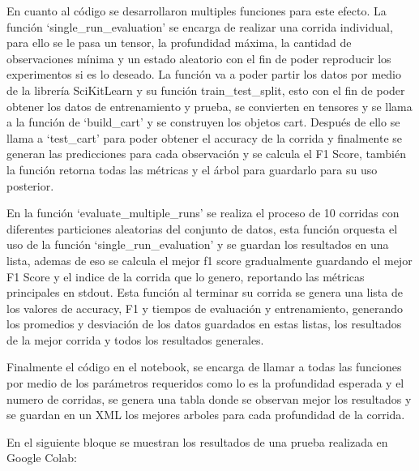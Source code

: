 \documentclass[12pt,a4paper]{article}
\begin{document}
En cuanto al código se desarrollaron multiples funciones para este efecto.
La función `single_run_evaluation' se encarga de realizar una corrida individual,
para ello se le pasa un tensor, la profundidad máxima, la cantidad de observaciones mínima y un estado aleatorio con el fin de
poder reproducir los experimentos si es lo deseado.
La función va a poder partir los datos por medio de la librería SciKitLearn y su función
train_test_split, esto con el fin de poder obtener los datos de entrenamiento y prueba, se convierten en tensores y se
llama a la función de `build_cart' y se construyen los objetos cart.
Después de ello se llama a `test_cart' para poder obtener el accuracy de la corrida y finalmente se generan
las predicciones para cada observación y se calcula el F1 Score, también la función retorna todas las métricas y el árbol para guardarlo
para su uso posterior.

En la función `evaluate_multiple_runs' se realiza el proceso de 10 corridas con diferentes particiones aleatorias del conjunto de datos,
esta función orquesta el uso de la función `single_run_evaluation' y se guardan los resultados en una lista, ademas de eso se calcula el mejor f1 score
gradualmente guardando el mejor F1 Score y el indice de la corrida que lo genero, reportando las métricas principales en stdout.
Esta función al terminar su corrida se genera una lista de los valores de accuracy, F1 y tiempos de evaluación y entrenamiento, generando los promedios y desviación de los
datos guardados en estas listas, los resultados de la mejor corrida y todos los resultados generales.

Finalmente el código en el notebook, se encarga de llamar a todas las funciones por medio de los parámetros requeridos como lo es
la profundidad esperada y el numero de corridas, se genera una tabla donde se observan mejor los resultados y se guardan en un XML
los mejores arboles para cada profundidad de la corrida.

En el siguiente bloque se muestran los resultados de una prueba realizada en Google Colab:
\end{document}
